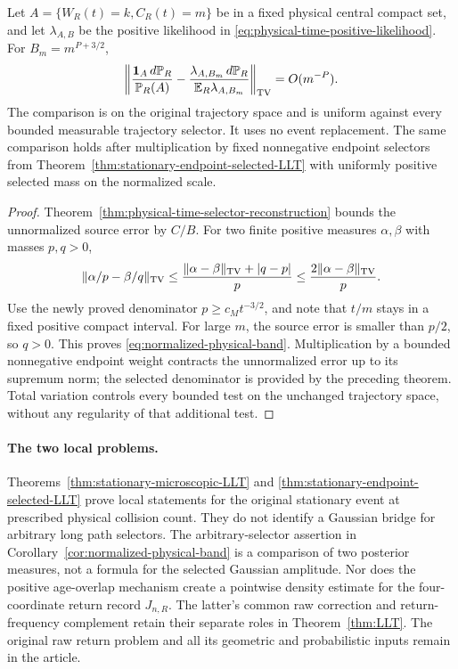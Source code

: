 \begin{corollary}
\label{cor:normalized-physical-band}
Let $A=\{W_R(t)=k,C_R(t)=m\}$ be in a fixed physical central compact
set, and let $\lambda_{A,B}$ be the positive likelihood in
\eqref{eq:physical-time-positive-likelihood}. For $B_m=m^{P+3/2}$,
\begin{equation}\label{eq:normalized-physical-band}
 \left\|\frac{\one_A\,d\mathbb P_R}{\mathbb P_R(A)}
       -\frac{\lambda_{A,B_m}\,d\mathbb P_R}
                           {\mathbb E_R\lambda_{A,B_m}}\right\|_{\TV}
                            =O(m^{-P}).
\end{equation}
The comparison is on the original trajectory space and is uniform
against every bounded measurable trajectory selector. It uses no event
replacement. The same comparison holds after multiplication by fixed
nonnegative endpoint selectors from
Theorem~\ref{thm:stationary-endpoint-selected-LLT} with uniformly
positive selected mass on the normalized scale.
\end{corollary}
\begin{proof}
Theorem~\ref{thm:physical-time-selector-reconstruction} bounds the
unnormalized source error by $C/B$. For two finite positive measures
$\alpha,\beta$ with masses $p,q>0$,
\[
 \|\alpha/p-\beta/q\|_{\operatorname{TV}}
 \le\frac{\|\alpha-\beta\|_{\operatorname{TV}}+|q-p|}{p}
 \le\frac{2\|\alpha-\beta\|_{\operatorname{TV}}}p.
\]
Use the newly proved denominator $p\ge c_M t^{-3/2}$, and note that
$t/m$ stays in a fixed positive compact interval. For large $m$, the
source error is smaller than $p/2$, so $q>0$. This proves
\eqref{eq:normalized-physical-band}. Multiplication by a bounded
nonnegative endpoint weight contracts the unnormalized error up to
its supremum norm; the selected denominator is provided by the preceding
theorem. Total variation controls every bounded test on the unchanged
trajectory space, without any regularity of that additional test.
\end{proof}

\paragraph{The two local problems.}
Theorems~\ref{thm:stationary-microscopic-LLT} and
\ref{thm:stationary-endpoint-selected-LLT} prove local statements for
the original stationary event at prescribed physical collision count.
They do not identify a Gaussian bridge for arbitrary long path selectors.
The arbitrary-selector assertion in
Corollary~\ref{cor:normalized-physical-band} is a comparison of two
posterior measures, not a formula for the selected Gaussian amplitude.
Nor does the positive age-overlap mechanism create a pointwise density
estimate for the four-coordinate return record $J_{n,R}$. The latter's
common raw correction and return-frequency complement retain their
separate roles in Theorem~\ref{thm:LLT}. The original raw return problem
and all its geometric and probabilistic inputs remain in the article.
